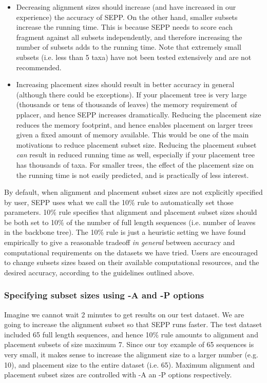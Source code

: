 \documentclass[11pt]{article} %
\newcommand{\sepp}{SEPP\xspace}
\newcommand{\pplacer}{pplacer\xspace}
\begin{document}
\begin{itemize} 
\item Decreasing alignment sizes should increase (and have increased in our experience) the accuracy of \sepp. On the other hand, smaller subsets increase the running time. This is because \sepp needs to score each fragment against all subsets independently, and therefore increasing the number of subsets adds to the running time. Note that extremely small subsets (i.e. less than 5 taxa) have not been tested extensively and are not recommended. 
\item Increasing placement sizes should result in better accuracy in general (although there could be exceptions). If your placement tree is very large (thousands or tens of thousands of leaves) the memory requirement of \pplacer, and hence \sepp increases dramatically. Reducing the placement size reduces the memory footprint, and hence enables placement on larger trees given a fixed amount of memory available. This would be one of the main motivations to reduce placement subset size. Reducing the placement subset {\em can} result in reduced running time as well, especially if your placement tree has thousands of taxa. For smaller trees, the effect of the placement size on the running time is not easily predicted, and is practically of less interest. 
\end{itemize}

By default, when alignment and placement subset sizes are not explicitly specified by user, \sepp uses what we call the 10\% rule to automatically set those parameters. 10\% rule specifies that alignment and placement subset sizes should be both set to 10\% of the number of full length sequences (i.e. number of leaves in the backbone tree). The 10\% rule is just a heuristic setting we have found empirically to give a reasonable tradeoff {\em in general} between accuracy and computational requirements on the datasets we have tried. Users are encouraged to change subsets sizes based on their available computational resources, and the desired accuracy, according to the guidelines outlined above.  

\subsubsection{Specifying subset sizes using -A and -P options}
Imagine we cannot wait 2 minutes to get results on our test dataset. We are going to increase the alignment subset so that \sepp runs faster. The test dataset included 65 full length sequences, and hence 10\% rule amounts to alignment and placement subsets of size maximum 7. Since our toy example of 65 sequences is very small, it makes sense to increase the alignment size to a larger number (e.g. 10), and placement size to the entire dataset (i.e. 65). Maximum alignment and placement subset sizes are controlled with -A an -P options respectively. 
\end{document}
